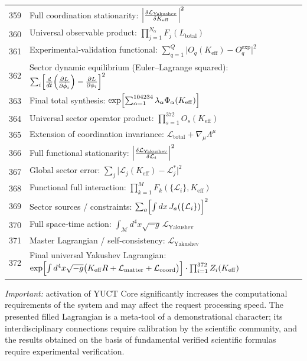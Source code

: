 \documentclass[12pt,a4paper]{article}
\begin{document}
\begin{longtable}{r l}
		359 & Full coordination stationarity: $\Bigl|\frac{\delta\mathcal{L}_{\text{Yakushev}}}{\delta K_{\mathrm{eff}}}\Bigr|^2$ \\
		360 & Universal observable product: $\prod_{j=1}^{N_\alpha}F_j(L_{\text{total}})$ \\
		361 & Experimental‑validation functional: $\sum_{q=1}^Q\bigl|O_q(K_{\mathrm{eff}}) - O_q^{\text{exp}}\bigr|^2$ \\
		362 & Sector dynamic equilibrium (Euler–Lagrange squared): $\sum_i\Bigl[\frac{d}{dt}\Bigl(\frac{\partial L}{\partial\dot\phi_i}\Bigr) - \frac{\partial L}{\partial\phi_i}\Bigr]^2$ \\
		363 & Final total synthesis: $\exp\Bigl[\sum_{\alpha=1}^{104234}\lambda_\alpha\Phi_\alpha(K_{\mathrm{eff}})\Bigr]$ \\
		364 & Universal sector operator product: $\prod_{s=1}^{372}O_s(K_{\mathrm{eff}})$ \\
		365 & Extension of coordination invariance: $\mathcal{L}_{\text{total}} + \nabla_\mu\Lambda^\mu$ \\
		366 & Full functional stationarity: $\Bigl|\frac{\delta\mathcal{L}_{\text{Yakushev}}}{\delta\mathcal{L}_i}\Bigr|^2$ \\
		367 & Global sector error: $\sum_j\bigl|\mathcal{L}_j(K_{\mathrm{eff}}) - \mathcal{L}_j^*\bigr|^2$ \\
		368 & Functional full interaction: $\prod_{k=1}^M F_k(\{\mathcal{L}_i\},K_{\mathrm{eff}})$ \\
		369 & Sector sources / constraints: $\sum_a\Bigl[\int dx\,J_a(\{\mathcal{L}_i\})\Bigr]^2$ \\
		370 & Full space‑time action: $\int_{\mathcal{M}} d^4x\sqrt{-g}\,\mathcal{L}_{\text{Yakushev}}$ \\
		371 & Master Lagrangian / self‑consistency: $\mathcal{L}_{\text{Yakushev}}$ \\
		372 & Final universal Yakushev Lagrangian: \scriptsize $\exp\Bigl[\int d^4x\sqrt{-g}\bigl(K_{\mathrm{eff}}R + \mathcal{L}_{\text{matter}} + \mathcal{L}_{\text{coord}}\bigr)\Bigr]\cdot\prod_{i=1}^{372}Z_i(K_{\mathrm{eff}})$ \\
		
	\end{longtable}
	
	\textit{Important:} activation of YUCT Core significantly increases the computational requirements of the system and may affect the request processing speed.
	The presented filled Lagrangian is a meta‑tool of a demonstrational character; its interdisciplinary connections require calibration by the scientific community, and the results obtained on the basis of fundamental verified scientific formulas require experimental verification.
	
\end{document}
